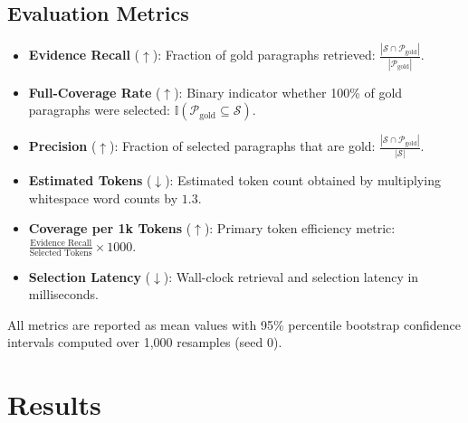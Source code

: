 \documentclass[conference]{IEEEtran}
\begin{document}
\subsection{Evaluation Metrics}
\begin{itemize}
    \item \textbf{Evidence Recall} ($\uparrow$): Fraction of gold paragraphs retrieved: $\frac{|\mathcal{S} \cap \mathcal{P}_{\text{gold}}|}{|\mathcal{P}_{\text{gold}}|}$.
    \item \textbf{Full-Coverage Rate} ($\uparrow$): Binary indicator whether 100\% of gold paragraphs were selected: $\mathbb{I}(\mathcal{P}_{\text{gold}} \subseteq \mathcal{S})$.
    \item \textbf{Precision} ($\uparrow$): Fraction of selected paragraphs that are gold: $\frac{|\mathcal{S} \cap \mathcal{P}_{\text{gold}}|}{|\mathcal{S}|}$.
    \item \textbf{Estimated Tokens} ($\downarrow$): Estimated token count obtained by multiplying whitespace word counts by $1.3$.
    \item \textbf{Coverage per 1k Tokens} ($\uparrow$): Primary token efficiency metric: $\frac{\text{Evidence Recall}}{\text{Selected Tokens}} \times 1000$.
    \item \textbf{Selection Latency} ($\downarrow$): Wall-clock retrieval and selection latency in milliseconds.
\end{itemize}
All metrics are reported as mean values with 95\% percentile bootstrap confidence intervals computed over 1,000 resamples (seed 0).

\section{Results}
\end{document}

